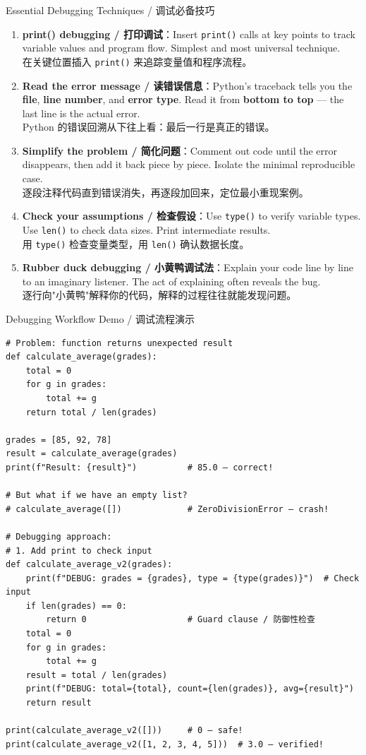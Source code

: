 \documentclass[11pt,a4paper]{report}
\let\oldtexttt\texttt
\renewcommand{\texttt}[1]{\textcolor{mainblue}{\oldtexttt{#1}}}
\begin{document}
\begin{concept}{Essential Debugging Techniques / 调试必备技巧}
    \begin{enumerate}[itemsep=0.8em]
        \item \textbf{print() debugging / 打印调试}：Insert \texttt{print()} calls at key points to track variable values and program flow. Simplest and most universal technique. \\
        在关键位置插入 \texttt{print()} 来追踪变量值和程序流程。
        \item \textbf{Read the error message / 读错误信息}：Python's traceback tells you the \textbf{file}, \textbf{line number}, and \textbf{error type}. Read it from \textbf{bottom to top} — the last line is the actual error. \\
        Python 的错误回溯从下往上看：最后一行是真正的错误。
        \item \textbf{Simplify the problem / 简化问题}：Comment out code until the error disappears, then add it back piece by piece. Isolate the minimal reproducible case. \\
        逐段注释代码直到错误消失，再逐段加回来，定位最小重现案例。
        \item \textbf{Check your assumptions / 检查假设}：Use \texttt{type()} to verify variable types. Use \texttt{len()} to check data sizes. Print intermediate results. \\
        用 \texttt{type()} 检查变量类型，用 \texttt{len()} 确认数据长度。
        \item \textbf{Rubber duck debugging / 小黄鸭调试法}：Explain your code line by line to an imaginary listener. The act of explaining often reveals the bug. \\
        逐行向"小黄鸭"解释你的代码，解释的过程往往就能发现问题。
    \end{enumerate}
\end{concept}

\begin{examplebox}{Debugging Workflow Demo / 调试流程演示}
\begin{lstlisting}
# Problem: function returns unexpected result
def calculate_average(grades):
    total = 0
    for g in grades:
        total += g
    return total / len(grades)

grades = [85, 92, 78]
result = calculate_average(grades)
print(f"Result: {result}")          # 85.0 — correct!

# But what if we have an empty list?
# calculate_average([])             # ZeroDivisionError — crash!

# Debugging approach:
# 1. Add print to check input
def calculate_average_v2(grades):
    print(f"DEBUG: grades = {grades}, type = {type(grades)}")  # Check input
    if len(grades) == 0:
        return 0                    # Guard clause / 防御性检查
    total = 0
    for g in grades:
        total += g
    result = total / len(grades)
    print(f"DEBUG: total={total}, count={len(grades)}, avg={result}")
    return result

print(calculate_average_v2([]))     # 0 — safe!
print(calculate_average_v2([1, 2, 3, 4, 5]))  # 3.0 — verified!
\end{lstlisting}
\end{examplebox}
\end{document}
